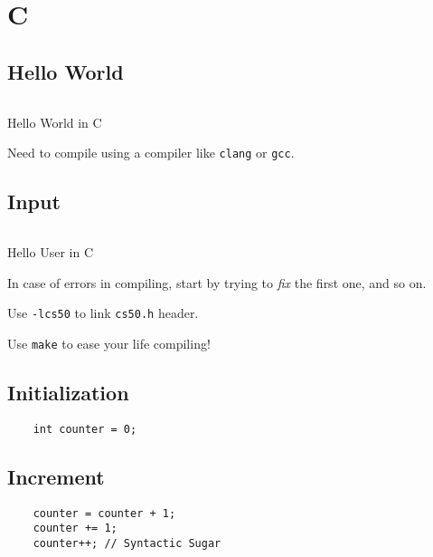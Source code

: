 \chapter{C}
\section{Hello World}
\begin{listing}[ht!]
	\inputminted[linenos]{c}{codes/helloWorld.c}
	\caption{Hello World in C}
\end{listing}

\begin{remark}
	Need to compile using a compiler like \texttt{clang} or
	\texttt{gcc}.
\end{remark}

\section{Input}
\begin{listing}[ht!]
	\inputminted[linenos]{c}{codes/helloUser.c}
	\caption{Hello User in C}
\end{listing}

\begin{remark}
	In case of errors in compiling, start by trying to \emph{fix} the first one, and so on.
\end{remark}

\begin{remark}
	Use \texttt{-lcs50} to link \texttt{cs50.h} header.
\end{remark}

\begin{remark}
	Use \texttt{make} to ease your life compiling!
\end{remark}

\clearpage
\section{Initialization}
\begin{verbatim}
	int counter = 0;
\end{verbatim}

\section{Increment}
\begin{verbatim}
	counter = counter + 1;
	counter += 1;
	counter++; // Syntactic Sugar
\end{verbatim}

